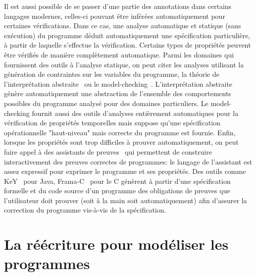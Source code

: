 Il est aussi possible de se passer d'une partie des  annotations dans certains langages modernes,
celles-ci pouvant être inférées automatiquement pour certaines vérifications.
Dans ce cas, une analyse automatique et statique (sans exécution) du programme
déduit automatiquement une spécification particulière, à partir de laquelle s'effectue la 
vérification. Certains types de propriétés peuvent être vérifiés de manière
complètement automatique.  Parmi les domaines qui fournissent des outils à l'analyse statique,
on peut citer les analyses utilisant la génération de contraintes sur les variables du programme, 
la théorie de l'interprétation abstraite~\cite{CousotC-POPL77} ou le model-checking~\cite{MC-Book}.
L'interprétation abstraite génère automatiquement une abstraction de l'ensemble des comportements possibles
du programme analysé pour des domaines particuliers. Le model-checking fournit aussi des outils d'analyses 
entièrement automatiques pour la vérification de propriétés temporelles mais suppose qu'une spécification opérationnelle
"haut-niveau" mais correcte du programme est fournie. 
Enfin, lorsque les propriétés sont trop difficiles à prouver automatiquement, on peut
faire appel à des assistants de preuves~\cite{Coq, Isa, Agda} qui permettent de construire interactivement 
des preuves correctes de programmes: le langage de l'assistant est assez expressif pour
exprimer le programme et ses propriétés. Des outils comme KeY~\cite{KEY} pour Java, Frama-C~\cite{FRAMAC} pour le C
génèrent à partir d'une spécification formelle et du code source d'un programme
des obligations de preuves que l'utilisateur doit prouver (soit à la main soit automatiquement)
afin d'assurer la correction du programme vis-à-vis de la spécification.

\section{La réécriture pour modéliser les programmes}


